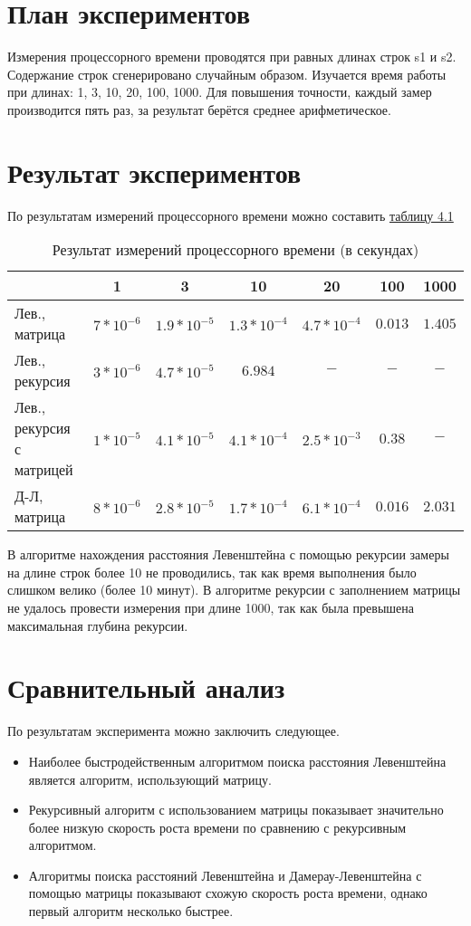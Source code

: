 \section*{План экспериментов}
Измерения процессорного времени проводятся при равных длинах строк s1 и s2. Содержание строк сгенерировано случайным образом. Изучается время работы при длинах: 1, 3, 10, 20, 100, 1000. Для повышения точности, каждый замер производится пять раз, за результат берётся среднее арифметическое.

\section*{Результат экспериментов}
По результатам измерений процессорного времени можно составить \hyperref[table_4_1]{таблицу 4.1}

\begin{table}[h] \label{table_4_1}
\caption{Результат измерений процессорного времени (в секундах)}
\begin{tabular}{| p{2cm} | c | c | c | c | c | c |}
	\hline
	& 1				&3				&10				&20				&100		&1000 \\
	\hline\hline
	Лев., матрица	&$7*10^{-6}$	&$1.9*10^{-5}$	&$1.3*10^{-4}$	&$4.7*10^{-4}$	&$0.013$	&$1.405$ \\
	\hline
	Лев., рекурсия	&$3*10^{-6}$	&$4.7*10^{-5}$	&$6.984$		&$-$			&$-$		&$-$ \\
	\hline
	Лев., рекурсия с матрицей
	&$1*10^{-5}$	&$4.1*10^{-5}$	&$4.1*10^{-4}$	&$2.5*10^{-3}$	&$0.38$		&$-$ \\
	\hline
	Д-Л, матрица	&$8*10^{-6}$	&$2.8*10^{-5}$	&$1.7*10^{-4}$	&$6.1*10^{-4}$	&$0.016$	&$2.031$ \\
	\hline
\end{tabular}
\end{table}

В алгоритме нахождения расстояния Левенштейна с помощью рекурсии замеры на длине строк более 10 не проводились, так как время выполнения было слишком велико (более 10 минут). В алгоритме рекурсии с заполнением матрицы не удалось провести измерения при длине 1000, так как была превышена максимальная глубина рекурсии.

\section*{Сравнительный анализ}
По результатам эксперимента можно заключить следующее.
\begin{itemize}
	\item Наиболее быстродейственным алгоритмом поиска расстояния Левенштейна является алгоритм, использующий матрицу.
	\item Рекурсивный алгоритм с использованием матрицы показывает значительно более низкую скорость роста времени по сравнению с рекурсивным алгоритмом.
	\item Алгоритмы поиска расстояний Левенштейна и Дамерау-Левенштейна с помощью матрицы показывают схожую скорость роста времени, однако первый алгоритм несколько быстрее.
\end{itemize}


	